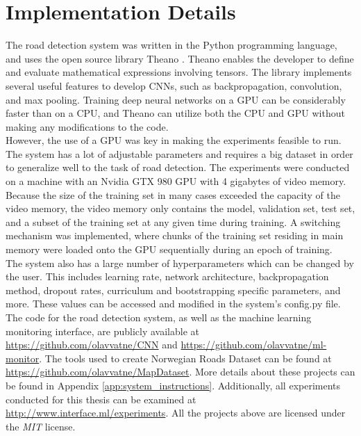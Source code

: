 \section{Implementation Details}
\label{sec:methods_implementation_details}
The road detection system was written in the Python programming language, and uses the open source library Theano \citep{bergstra_theano}. Theano enables the developer to define and evaluate mathematical expressions involving tensors. The library implements several useful features to develop \ac{CNN}s, such as backpropagation, convolution, and max pooling. Training deep neural networks on a \ac{GPU} can be considerably faster than on a \ac{CPU}, and Theano can utilize both the \ac{CPU} and \ac{GPU} without making any modifications to the code.\\

However, the use of a \ac{GPU} was key in making the experiments feasible to run. The system has a lot of adjustable parameters and requires a big dataset in order to generalize well to the task of road detection. The experiments were conducted on a machine with an Nvidia GTX 980 \ac{GPU} with 4 gigabytes of video memory. \\

Because the size of the training set in many cases exceeded the capacity of the video memory, the video memory only contains the model, validation set, test set, and a subset of the training set at any given time during training. A switching mechanism was implemented, where chunks of the training set residing in main memory were loaded onto the \ac{GPU} sequentially during an epoch of training.\\

The system also has a large number of hyperparameters which can be changed by the user. This includes learning rate, network architecture, backpropagation method, dropout rates, curriculum and bootstrapping specific parameters, and more. These values can be accessed and modified in the system's config.py file. \\

The code for the road detection system, as well as the machine learning monitoring interface, are publicly available at 
\url{https://github.com/olavvatne/CNN} and \url{https://github.com/olavvatne/ml-monitor}. The tools used to create Norwegian Roads Dataset can be found at \url{https://github.com/olavvatne/MapDataset}. More details about these projects can be found in Appendix \ref{app:system_instructions}. Additionally, all experiments conducted for this thesis can be examined at \url{http://www.interface.ml/experiments}. All the projects above are licensed under the \emph{MIT} license.

